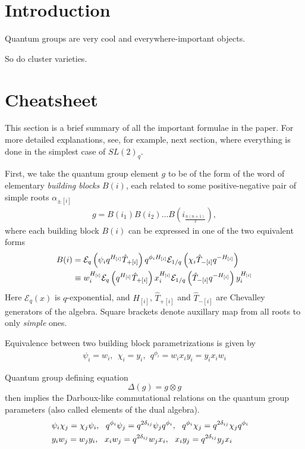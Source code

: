 \documentclass{article}
\newcommand{\lb}{\left (}
\newcommand{\rb}{\right )}
\newcommand{\lsb}{\left [}
\newcommand{\rsb}{\right ]}
\newcommand{\be}{\begin{eqnarray}}
\newcommand{\ee}{\end{eqnarray}}
\newcommand {\?}{\textit{???}}
\newcommand{\me}[0]{\mathcal{E}}
\newcommand{\hT}[0]{\hat{T}}
\def\dg{\Delta (g)}
\def\gog{g \otimes g}
\begin{document}
\section{Introduction}
Quantum groups are very cool and everywhere-important objects.

So do cluster varieties.

\section{Cheatsheet}

This section is a brief summary of all the important formulae in the paper.
For more detailed explanations, see, for example, next section, where everything is
 done in the simplest case of $SL(2)_q$.

First, we take the quantum group element $g$ to be of the form
of the word of elementary {\it building blocks} $B(i)$, each related to some positive-negative pair
of simple roots $\alpha_{\pm \lsb i \rsb}$
\be
g = B \lb i_1 \rb B \lb i_2 \rb \dots B \lb i_{\frac{n(n + 1)}{2}} \rb,
\ee
where each building block $B(i)$ can be expressed in one of the two equivalent forms
\begin{align}
B(i) & = \me_q \lb \psi_i q^{H_{[i]}} \hT_{+[i]} \rb q^{\phi_i H_{[i]}} \me_{1/q} \lb \chi_i \hT_{-[i]} q^{-H_{[i]}} \rb \\ \notag
& \equiv
w_i^{H_{[i]}} \me_q \lb q^{H_{[i]}} \hT_{+[i]} \rb x_i^{H_{[i]}} \me_{1/q} \lb \hT_{-[i]} q^{-H_{[i]}} \rb y_i^{H_{[i]}}
\end{align}
Here $\me_q(x)$ is $q$-exponential, and $H_{[i]}$, $\hT_{+[i]}$ and $\hT_{-[i]}$ are Chevalley generators of the algebra.
Square brackets denote auxillary map from all roots to only {\it simple} ones.

Equivalence between two building block parametrizations is given by
\be
\psi_i = w_i,\ \ \chi_i = y_i,\ \ q^{\phi_i} = w_i x_i y_i = y_i x_i w_i
\ee

Quantum group defining equation
\begin{equation}
\label{eq:q-group-def}
\dg = \gog
\end{equation}
 then implies the Darboux-like commutational
relations on the quantum group parameters (also called elements of the dual algebra).
\begin{align}
& \psi_i \chi_j = \chi_j \psi_i, \ \ q^{\phi_i} \psi_j = q^{2 \delta_{ij}} \psi_j q^{\phi_i}, \ \
q^{\phi_i} \chi_j = q^{2 \delta_{ij}} \chi_j q^{\phi_i} & \\ \notag &
y_i w_j = w_j y_i, \ \ x_i w_j = q^{2\delta_{ij}} w_j x_i, \ \ x_i y_j = q^{2\delta_{ij}} y_j x_i
\end{align}
\end{document}
